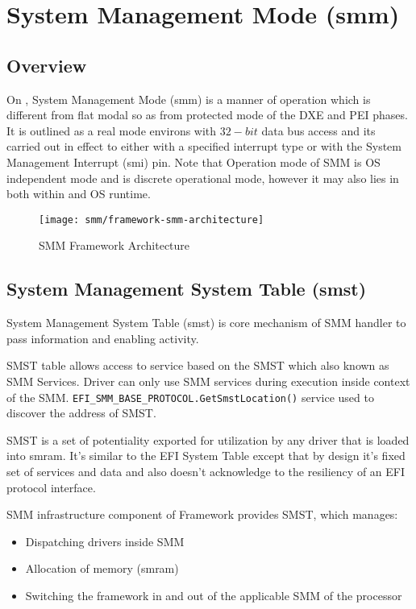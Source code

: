 \section{System Management Mode (\gls{smm})}\label{section-smm}
\subsection{Overview}
On , System Management Mode (\gls{smm}) is a manner of operation which is different from flat modal so as from protected mode of the DXE and PEI phases. It is outlined as a real mode environs with $ 32-bit $ data bus access and its carried out in effect to either with a specified interrupt type or with the System Management Interrupt (\gls{smi}) pin. Note that Operation mode of SMM is OS independent mode and is discrete operational mode, however it may also lies in both within and OS runtime.

\begin{figure}[!htbp]
	\centering
	\texttt{[image: smm/framework-smm-architecture]}
	\caption{SMM Framework Architecture}\label{fig:framework-smm-architecture}
\end{figure}


\subsection{System Management System Table (\gls{smst})}
System Management System Table (\gls{smst}) is core mechanism of SMM handler to pass information and enabling activity.

SMST table allows access to service based on the SMST which also known as SMM Services. Driver can only use SMM services during execution inside context of the SMM. \verb|EFI_SMM_BASE_PROTOCOL.GetSmstLocation()| service used to discover the address of SMST.

SMST is a set of potentiality exported for utilization by any driver that is loaded into \gls{smram}. It's similar to the EFI System Table except that by design it's fixed set of services and data and also doesn't acknowledge to the resiliency of an EFI protocol interface.

SMM infrastructure component of Framework provides SMST, which manages:
\begin{itemize}
	\item Dispatching drivers inside SMM
	\item Allocation of memory (\gls{smram})
	\item Switching the framework in and out of the applicable SMM of the processor
\end{itemize}


